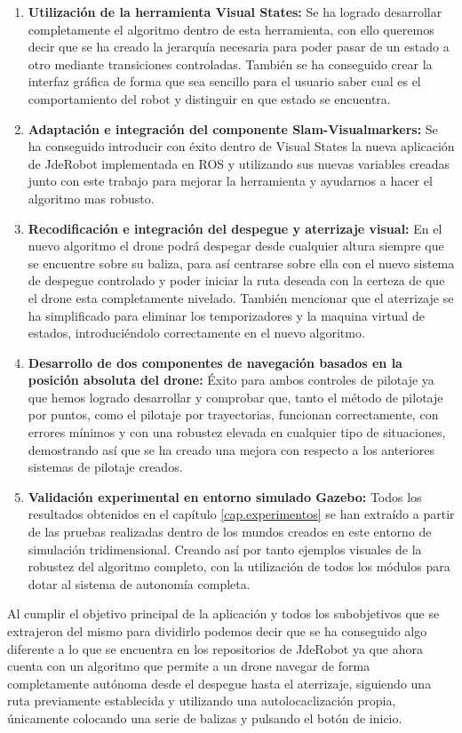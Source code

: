 \begin{enumerate}
	\item{\textbf{Utilización de la herramienta Visual States:} Se ha logrado desarrollar completamente el algoritmo dentro de esta herramienta, con ello queremos decir que se ha creado la jerarquía necesaria para poder pasar de un estado a otro mediante transiciones controladas. También se ha conseguido crear la interfaz gráfica de forma que sea sencillo para el usuario saber cual es el comportamiento del robot y distinguir en que estado se encuentra.}
	\item{\textbf{Adaptación e integración del componente Slam-Visualmarkers:} Se ha conseguido introducir con éxito dentro de Visual States la nueva aplicación de JdeRobot implementada en ROS y utilizando sus nuevas variables creadas junto con este trabajo para mejorar la herramienta y ayudarnos a hacer el algoritmo mas robusto.}	
	\item{\textbf{Recodificación e integración del despegue y aterrizaje visual:} En el nuevo algoritmo el drone podrá despegar desde cualquier altura siempre que se encuentre sobre su baliza, para así centrarse sobre ella con el nuevo sistema de despegue controlado y poder iniciar la ruta deseada con la certeza de que el drone esta completamente nivelado. También mencionar que el aterrizaje se ha simplificado para eliminar los temporizadores y la maquina virtual de estados, introduciéndolo correctamente en el nuevo algoritmo.}
	\item{\textbf{Desarrollo de dos componentes de navegación basados en la posición absoluta del drone:} Éxito para ambos controles de pilotaje ya que hemos logrado desarrollar y comprobar que, tanto el método de pilotaje por puntos, como el pilotaje por trayectorias, funcionan correctamente, con errores mínimos y con una robustez elevada en cualquier tipo de situaciones, demostrando así que se ha creado una mejora con respecto a los anteriores sistemas de pilotaje creados.}
	\item{\textbf{Validación experimental en entorno simulado Gazebo:} Todos los resultados obtenidos en el capítulo \ref{cap.experimentos} se han extraído a partir de las pruebas realizadas dentro de los mundos creados en este entorno de simulación tridimensional. Creando así por tanto ejemplos visuales de la robustez del algoritmo completo, con la utilización de todos los módulos para dotar al sistema de autonomía completa.}
\end{enumerate}

\hspace{1cm} Al cumplir el objetivo principal de la aplicación y todos los subobjetivos que se extrajeron del mismo para dividirlo podemos decir que se ha conseguido algo diferente a lo que se encuentra en los repositorios de JdeRobot ya que ahora cuenta con un algoritmo que permite a un drone navegar de forma completamente autónoma desde el despegue hasta el aterrizaje, siguiendo una ruta previamente establecida y utilizando una autolocaclización propia, únicamente colocando una serie de balizas y pulsando el botón de inicio.

